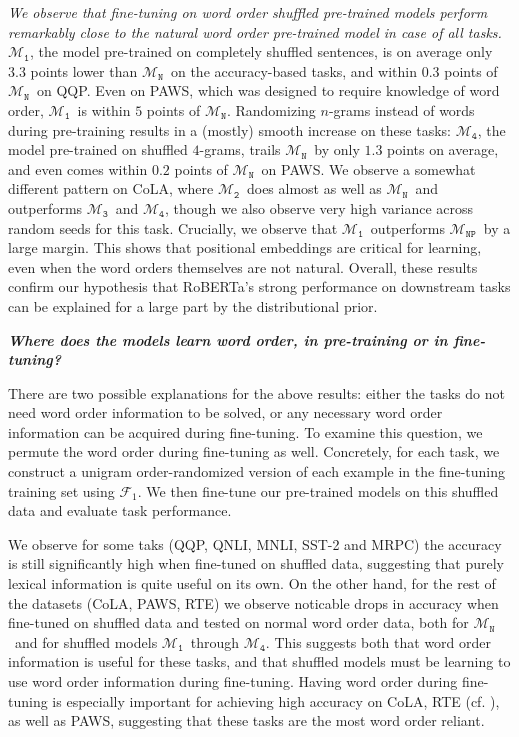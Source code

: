 \documentclass[12pt]{article}
\newcommand{\xit}[1]{{\noindent\textbf{\textit{#1}}}}
\newcommand{\OR}{$\mathcal{M}_{\texttt{N}}$}
\newcommand{\RI}{$\mathcal{M}_{\texttt{1}}$}
\newcommand{\RII}{$\mathcal{M}_{\texttt{2}}$}
\newcommand{\RIII}{$\mathcal{M}_{\texttt{3}}$}
\newcommand{\RIV}{$\mathcal{M}_{\texttt{4}}$}
\newcommand{\NP}{$\mathcal{M}_{\texttt{NP}}$}
\begin{document}
\textit{We observe that fine-tuning on word order shuffled pre-trained models perform remarkably close to the natural word order pre-trained model in case of all tasks.} \RI, the model pre-trained on completely shuffled sentences, is on average only $3.3$ points lower than \OR\ on the accuracy-based tasks,
and within $0.3$ points of \OR\ on QQP.
Even on PAWS, which was designed to require knowledge of word order, \RI\ is within $5$ points of \OR.
Randomizing $n$-grams instead of words during pre-training results in a (mostly) smooth increase on these tasks: \RIV, the model pre-trained on shuffled $4$-grams, trails \OR\ by only $1.3$ points on average, and even comes within $0.2$ points of \OR\ on PAWS. We observe a somewhat different pattern on CoLA, where \RII\ does almost as well as \OR\ and outperforms \RIII\ and \RIV, though we also observe very high variance across random seeds for this task.
Crucially, we observe that \RI\ outperforms \NP\ by a large margin. This shows that positional embeddings are critical for learning, even when the word orders themselves are not natural.
Overall, these results confirm our hypothesis that RoBERTa's strong performance on downstream tasks can be explained for a large part by the distributional prior.


\xit{Where does the models learn word order, in pre-training or in fine-tuning?}

There are two possible explanations for the above results: either the tasks do not need word order information to be solved, or any necessary word order information can be acquired during fine-tuning.
To examine this question, we permute the word order during fine-tuning as well. Concretely, for each task, we construct a unigram order-randomized version of each example in the fine-tuning training set using $\mathcal{F}_1$. We then fine-tune our pre-trained models on this shuffled data and evaluate task performance.

We observe for some taks (QQP, QNLI, MNLI, SST-2 and MRPC) the accuracy is still significantly high when fine-tuned on shuffled data, suggesting that purely lexical information is quite useful on its own. On the other hand, for the rest of the datasets (CoLA, PAWS, RTE) we observe noticable drops in accuracy when fine-tuned on shuffled data and tested on normal word order data, both for \OR\ and for shuffled models \RI\ through \RIV.
This suggests both that word order information is useful for these tasks, and that shuffled models must be learning to use word order information during fine-tuning. Having word order during fine-tuning is especially important for achieving high accuracy on CoLA, RTE (cf. \cite{pham2020}), as well as PAWS,
suggesting that these tasks are the most word order reliant.
\end{document}
